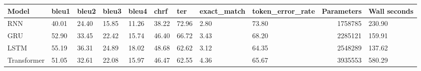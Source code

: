 \begin{tabular}{lllllllllrl}
\toprule
Model & bleu1 & bleu2 & bleu3 & bleu4 & chrf & ter & exact\_match & token\_error\_rate & Parameters & Wall seconds \\
\midrule
RNN & 40.01 & 24.40 & 15.85 & 11.26 & 38.22 & 72.96 & 2.80 & 73.80 & 1758785 & 230.90 \\
GRU & 52.90 & 33.45 & 22.42 & 15.74 & 46.40 & 66.72 & 3.43 & 68.20 & 2285121 & 159.91 \\
LSTM & 55.19 & 36.31 & 24.89 & 18.02 & 48.68 & 62.62 & 3.12 & 64.35 & 2548289 & 137.62 \\
Transformer & 51.05 & 32.61 & 22.08 & 15.97 & 46.47 & 62.55 & 4.36 & 65.67 & 3935553 & 580.29 \\
\bottomrule
\end{tabular}
